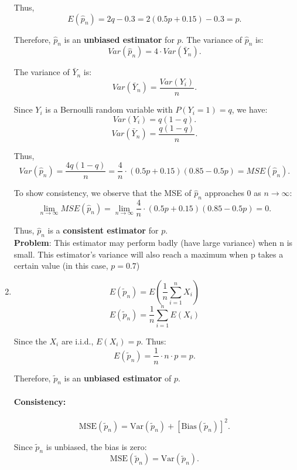\documentclass[12pt,letterpaper, onecolumn]{exam}
\begin{document}
\begin{questions}
\begin{solution}
\begin{enumerate}
        Thus,
        \[
        E(\hat{p}_n) = 2q - 0.3 = 2(0.5p + 0.15) - 0.3 = p.
        \]

        Therefore, \(\hat{p}_n\) is an \textbf{unbiased estimator} for \(p\).
        The variance of \(\hat{p}_n\) is:
        \[
        Var(\hat{p}_n) = 4 \cdot Var(\bar{Y}_n).
        \]

        The variance of \(\bar{Y}_n\) is:
        \[
        Var(\bar{Y}_n) = \frac{Var(Y_i)}{n}.
        \]

        Since \(Y_i\) is a Bernoulli random variable with \(P(Y_i = 1) = q\), we have:
        \[
       Var(Y_i) = q(1 - q).
        \]
        \[
        Var(\bar{Y}_n) = \frac{q(1 - q)}{n}.
        \]

        Thus,
        \[
        Var(\hat{p}_n) =\frac{4q(1-q)}{n}=  \frac{4}{n} \cdot (0.5p + 0.15)(0.85 - 0.5p) = MSE(\hat{p}_n).
        \]


        To show consistency, we observe that the MSE of \(\hat{p}_n\) approaches 0 as \(n \to \infty\):
        \[
        \lim_{n \to \infty} MSE(\hat{p}_n) = \lim_{n \to \infty} \frac{4}{n} \cdot (0.5p + 0.15)(0.85 - 0.5p) = 0.
        \]

        Thus, \(\hat{p}_n\) is a \textbf{consistent estimator} for \(p\).  \\
        \textbf{ Problem}: This estimator may perform badly (have large variance) when n is small. This estimator's variance will also reach a maximum when p takes a certain value (in this case, $p=0.7$)
     \item \[
        E(\tilde{p}_n) = E\left(\frac{1}{n} \sum_{i=1}^n X_i\right)
        \]
        \[
        E(\tilde{p}_n) = \frac{1}{n} \sum_{i=1}^n E(X_i)
        \]
        
        Since the \(X_i\) are i.i.d., \(E(X_i) = p\). Thus:
        \[
        E(\tilde{p}_n) = \frac{1}{n} \cdot n \cdot p = p.
        \]
        
        Therefore, \(\tilde{p}_n\) is an \textbf{unbiased estimator} of \(p\).
        
        \paragraph{Consistency:}
        \[
        \mathrm{MSE}(\tilde{p}_n) = \mathrm{Var}(\tilde{p}_n) + [\text{Bias}(\tilde{p}_n)]^2.
        \]
        
        Since \(\tilde{p}_n\) is unbiased, the bias is zero:
        \[
        \mathrm{MSE}(\tilde{p}_n) = \mathrm{Var}(\tilde{p}_n).
        \]
        

\end{enumerate}
\end{solution}
\end{questions}
\end{document}
